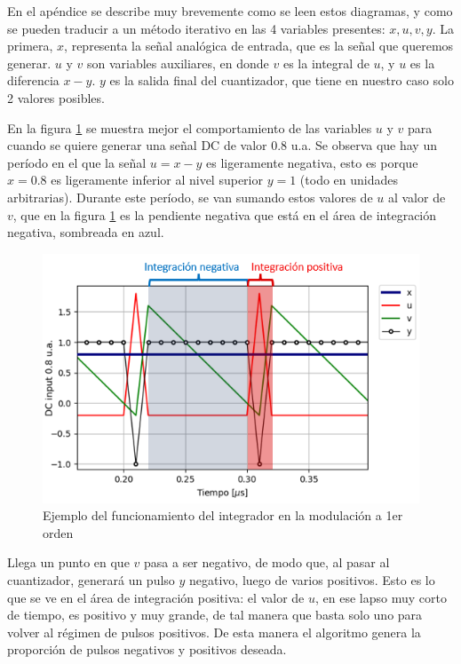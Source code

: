 \documentclass[twoside]{article}
\begin{document}
\begin{multicols}{2}
En el apéndice se describe muy brevemente como se leen estos diagramas, y como se pueden traducir a un método iterativo en las 4 variables presentes: $x,u,v,y$.
La primera, $x$, representa la señal analógica de entrada, que es la señal que queremos generar. $u$ y $v$ son variables auxiliares, en donde $v$ es la integral de $u$, y $u$ es la diferencia $x-y$. $y$ es la salida final del cuantizador, que tiene en nuestro caso solo 2 valores posibles.



En la figura \ref{fig:integrador} se muestra mejor el comportamiento de las variables $u$ y $v$ para cuando se quiere generar una señal DC de valor 0.8 u.a. Se observa que hay un período en el que la señal $u=x-y$ es ligeramente negativa, esto es porque $x=0.8$ es ligeramente inferior al nivel superior $y=1$ (todo en unidades arbitrarias). Durante este período, se van sumando estos valores de $u$ al valor de $v$, que en la figura \ref{fig:integrador} es la pendiente negativa que está en el área de integración negativa, sombreada en azul.


\begin{figure}[H]
\centering
\includegraphics[width=\linewidth]{figuras/integracion.png}
\caption{Ejemplo del funcionamiento del integrador en la modulación a 1er orden}
\label{fig:integrador}
\end{figure}

Llega un punto en que $v$ pasa a ser negativo, de modo que, al pasar al cuantizador, generará un pulso $y$ negativo, luego de varios positivos. Esto es lo que se ve en el área de integración positiva: el valor de $u$, en ese lapso muy corto de tiempo, es positivo y muy grande, de tal manera que basta solo uno para volver al régimen de pulsos positivos. De esta manera el algoritmo genera la proporción de pulsos negativos y positivos deseada.


\end{multicols}
\end{document}
